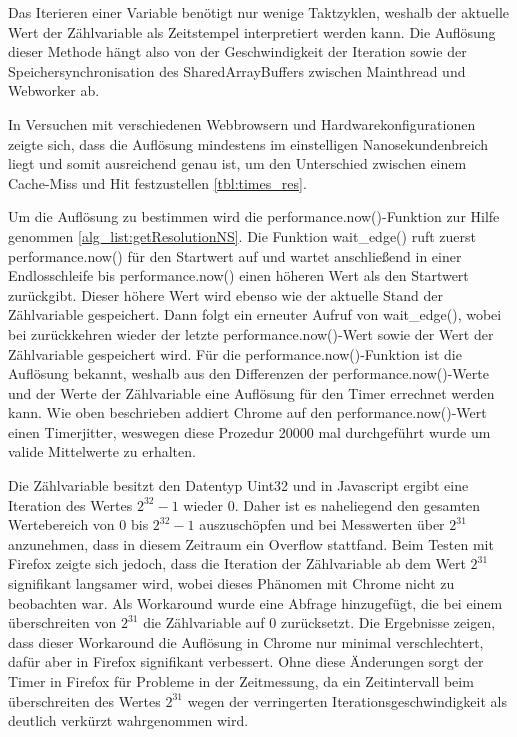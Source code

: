 Das Iterieren einer Variable benötigt nur wenige Taktzyklen, weshalb der aktuelle Wert der Zählvariable als Zeitstempel interpretiert werden kann. 
Die Auflösung dieser Methode hängt also von der Geschwindigkeit der Iteration sowie der Speichersynchronisation des SharedArrayBuffers zwischen Mainthread und Webworker ab.

In Versuchen mit verschiedenen Webbrowsern und Hardwarekonfigurationen zeigte sich, dass die Auflösung mindestens im einstelligen Nanosekundenbreich liegt und somit ausreichend genau ist, um den Unterschied zwischen einem Cache-Miss und Hit festzustellen \ref{tbl:times_res}.

Um die Auflösung zu bestimmen wird die performance.now()-Funktion zur Hilfe genommen \ref{alg_list:getResolutionNS}. Die Funktion wait_edge() ruft zuerst performance.now() für den Startwert auf und wartet anschließend in einer Endlosschleife bis performance.now() einen höheren Wert als den Startwert zurückgibt. 
Dieser höhere Wert wird ebenso wie der aktuelle Stand der Zählvariable gespeichert. 
Dann folgt ein erneuter Aufruf von wait_edge(), wobei bei zurückkehren wieder der letzte performance.now()-Wert sowie der Wert der Zählvariable gespeichert wird.
Für die performance.now()-Funktion ist die Auflösung bekannt, weshalb aus den Differenzen der performance.now()-Werte und der Werte der Zählvariable eine Auflösung für den Timer errechnet werden kann.
Wie oben beschrieben addiert Chrome auf den performance.now()-Wert einen Timerjitter, weswegen diese Prozedur 20000 mal durchgeführt wurde um valide Mittelwerte zu erhalten.

Die Zählvariable besitzt den Datentyp Uint32 und in Javascript ergibt eine Iteration des Wertes $2^{32}-1$ wieder 0. 
Daher ist es naheliegend den gesamten Wertebereich von 0 bis $2^{32}-1$ auszuschöpfen und bei Messwerten über $2^{31}$ anzunehmen, dass in diesem Zeitraum ein Overflow stattfand.
Beim Testen mit Firefox zeigte sich jedoch, dass die Iteration der Zählvariable ab dem Wert $2^{31}$ signifikant langsamer wird, wobei dieses Phänomen mit Chrome nicht zu beobachten war.
Als Workaround wurde eine Abfrage hinzugefügt, die bei einem überschreiten von $2^{31}$ die Zählvariable auf 0 zurücksetzt.
Die Ergebnisse zeigen, dass dieser Workaround die Auflösung in Chrome nur minimal verschlechtert, dafür aber in Firefox signifikant verbessert.
Ohne diese Änderungen sorgt der Timer in Firefox für Probleme in der Zeitmessung, da ein Zeitintervall beim überschreiten des Wertes $2^{31}$ wegen der verringerten Iterationsgeschwindigkeit als deutlich verkürzt wahrgenommen wird.

